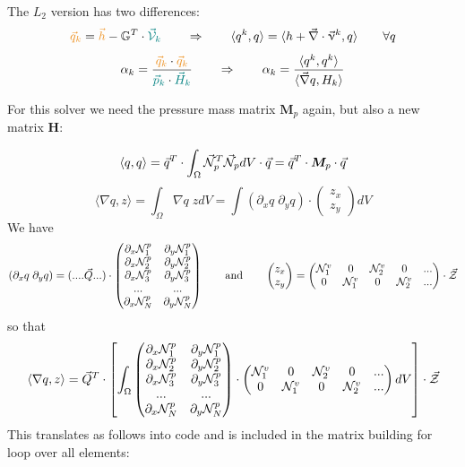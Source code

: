 The $L_2$ version has two differences:
\[
{\color{carrotorange} \vec{q}_k} = 
{\color{carrotorange} \vec{h}} - \mathbb{G}^T \cdot {\color{teal} \vec{\cal V}_k} 
\qquad
\Rightarrow
\qquad
\langle q^k,q \rangle  = \langle h+ \vec\nabla \cdot \vec\upnu^k,q \rangle \qquad \forall q
\]
\[
\alpha_k = \frac{  {\color{carrotorange} \vec{q}_k} \cdot {\color{carrotorange} \vec{q}_k}}
{ {\color{teal} \vec{p}_k} \cdot {\color{teal} \vec{H}_k }} 
\qquad
\Rightarrow
\qquad
\alpha_k = \frac{ \langle q^k,q^k  \rangle  }{ \langle \vec\nabla q , H_k  \rangle   }
\]




For this solver we need the pressure mass matrix ${\bm M}_p$ again, but also a new
matrix ${\bm H}$:

\[
\langle q,q \rangle 
= \vec{q}^T \cdot \int_\Omega \vec{\cal N}_p^T \vec{\cal N}_p dV \cdot \vec{q} = \vec{q}^T \cdot {\bm M}_p \cdot \vec{q}
\]
\[
\langle \nabla q,z\rangle = \int_\Omega  \nabla q \; z dV = 
\int (\partial_x q \; \partial_y q) \cdot 
\begin{pmatrix}
z_x \\ z_y
\end{pmatrix}
dV
\]
We have 
\[
(\partial_x q \; \partial_y q) =
(.... \vec{Q} ... ) \cdot
\begin{pmatrix}
\partial_x {\mathcal{N}}_1^p & \partial_y {\mathcal{N}}_1^ p\\
\partial_x {\mathcal{N}}_2^p & \partial_y {\mathcal{N}}_2^ p\\
\partial_x {\mathcal{N}}_3^p & \partial_y {\mathcal{N}}_3^ p\\
...  & ... \\
\partial_x {\mathcal{N}}_N^p & \partial_y {\mathcal{N}}_N^ p
\end{pmatrix}
\qquad
\text{and}
\qquad
\begin{pmatrix}
z_x \\ z_y
\end{pmatrix}
=
\begin{pmatrix}
{\mathcal{N}}_1^v & 0 & {\mathcal{N}}_2^v & 0 & ... \\
0 & {\mathcal{N}}_1^v & 0 & {\mathcal{N}}_2^v & ... \\
\end{pmatrix}
\cdot
\vec{\cal Z}
\]
so that 
\[
\langle \nabla q,z\rangle
= 
\vec{Q}^T \cdot 
\left[
\int_\Omega
\begin{pmatrix}
\partial_x {\mathcal{N}}_1^p & \partial_y {\mathcal{N}}_1^ p\\
\partial_x {\mathcal{N}}_2^p & \partial_y {\mathcal{N}}_2^ p\\
\partial_x {\mathcal{N}}_3^p & \partial_y {\mathcal{N}}_3^ p\\
...  & ... \\
\partial_x {\mathcal{N}}_N^p & \partial_y {\mathcal{N}}_N^ p
\end{pmatrix}
\cdot
\begin{pmatrix}
{\mathcal{N}}_1^v & 0 & {\mathcal{N}}_2^v & 0 & ... \\
0 & {\mathcal{N}}_1^v & 0 & {\mathcal{N}}_2^v & ... \\
\end{pmatrix}
dV \right]
\cdot
\vec{\cal Z}
\]
This translates as follows into code and is included in the 
matrix building for loop over all elements:

